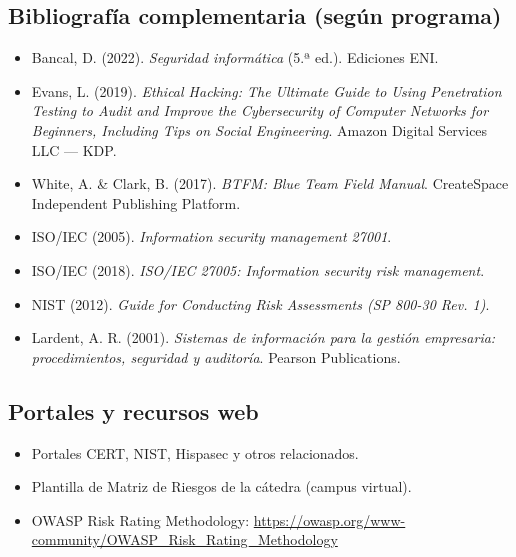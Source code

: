\documentclass[11pt,a4paper]{article}
\begin{document}
\subsection{Bibliografía complementaria (según programa)}
\begin{itemize}[leftmargin=*]
  \item Bancal, D. (2022). \textit{Seguridad informática} (5.ª ed.). Ediciones ENI.
  \item Evans, L. (2019). \textit{Ethical Hacking: The Ultimate Guide to Using Penetration Testing to Audit and Improve the Cybersecurity of Computer Networks for Beginners, Including Tips on Social Engineering}. Amazon Digital Services LLC --- KDP.
  \item White, A. \& Clark, B. (2017). \textit{BTFM: Blue Team Field Manual}. CreateSpace Independent Publishing Platform.
  \item ISO/IEC (2005). \textit{Information security management 27001}.
  \item ISO/IEC (2018). \textit{ISO/IEC 27005: Information security risk management}.
  \item NIST (2012). \textit{Guide for Conducting Risk Assessments (SP 800-30 Rev. 1)}.
  \item Lardent, A. R. (2001). \textit{Sistemas de información para la gestión empresaria: procedimientos, seguridad y auditoría}. Pearson Publications.
\end{itemize}

\subsection{Portales y recursos web}
\begin{itemize}[leftmargin=*]
  \item Portales CERT, NIST, Hispasec y otros relacionados.
  \item Plantilla de Matriz de Riesgos de la cátedra (campus virtual).
  \item OWASP Risk Rating Methodology: \url{https://owasp.org/www-community/OWASP_Risk_Rating_Methodology}
\end{itemize}
\end{document}
